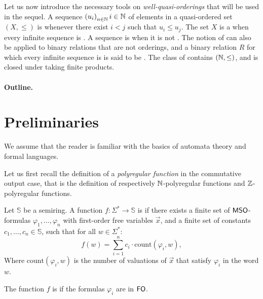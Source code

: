 \documentclass[11pt]{article}
\begin{document}
\AP Let us now introduce the necessary tools on \emph{well-quasi-orderings}
that will be used in the sequel. A sequence $\seqof{u_i}{i \in \Nat}$ of
elements in a quasi-ordered set $(X, \leq)$ is  whenever there
exist $i < j$ such that $u_i \leq u_j$. The set $X$ is a
 when every infinite sequence is . A
sequence is  when it is not . The notion of  can also be applied to binary relations that are not orderings, and
a binary relation $R$ for which every infinite sequence is  is said to
be  \cite{MELL98}. The class of  contains
$(\mathbb{N}, \leq)$, and is closed under taking finite products.

\paragraph{Outline.}



\section{Preliminaries}
\label{preliminaries:sec}

We assume that the reader is familiar with the basics of automata theory and
formal languages. 

Let us first recall the definition of a \emph{polyregular function} in the
commutative output case, that is the definition of respectively
$\mathbb{N}$-polyregular functions and $\mathbb{Z}$-polyregular functions.

\begin{definition}
    \label{polyregular-function:def}
    Let $\mathbb{S}$ be a semiring.
    A function $f \colon \Sigma^* \to \mathbb{S}$ is  if
    there exists a finite set of $\mathsf{MSO}$-formulas $\varphi_1, \ldots, \varphi_n$
    with first-order free variables $\vec{x}$, and a finite set of
    constants $c_1, \ldots, c_n \in \mathbb{S}$, such that
    for all $w \in \Sigma^*$:
    \begin{equation*}
        f(w) = \sum_{i=1}^n c_i \cdot \text{count}(\varphi_i, w),
    \end{equation*}
    Where $\text{count}(\varphi_i, w)$ is the number of valuations of $\vec{x}$
    that satisfy $\varphi_i$ in the word $w$.

    The function $f$ is  if the formulas $\varphi_i$ are
    in $\mathsf{FO}$.
\end{definition}
\end{document}
